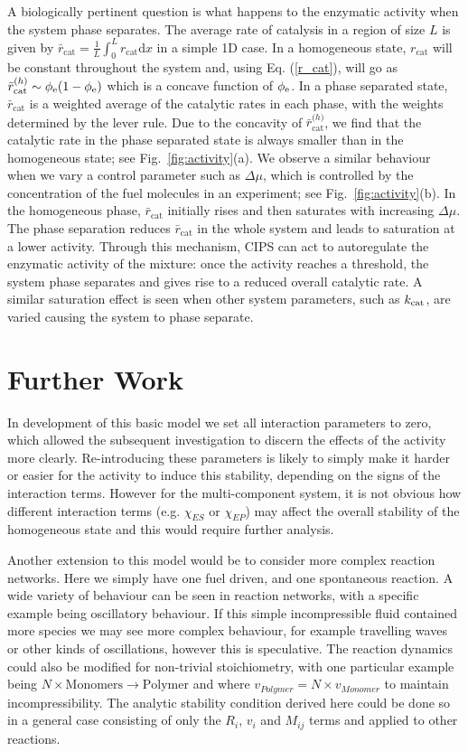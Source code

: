 A biologically pertinent question is what happens to the enzymatic activity when the system phase separates. The average rate of catalysis in a region of size $L$ is given by $\bar{r}_\mathrm{cat} = \frac{1}{L}\int_0^L r_\mathrm{cat} \mathrm{d}x$ in a simple 1D case. In a homogeneous state, $r_\mathrm{cat}$ will be constant throughout the system and, using Eq. (\ref{r_cat}), will go as $\bar{r}_\mathrm{cat}^{\mathrm(h)}\sim\phi_{\mathrm{e}}(1-\phi_{\mathrm{e}})$ which is a concave function of $\phi_{\mathrm{e}}$. In a phase separated state, $\bar{r}_\mathrm{cat}$ is a weighted average of the catalytic rates in each phase, with the weights determined by the lever rule. Due to the concavity of $\bar{r}_\mathrm{cat}^{\mathrm(h)}$, we find that the catalytic rate in the phase separated state is always smaller than in the homogeneous state; see Fig.~\ref{fig:activity}(a). We observe a similar behaviour when we vary a control parameter such as $\Delta\mu$, which is controlled by the concentration of the fuel molecules in an experiment; see Fig.~\ref{fig:activity}(b). In the homogeneous phase, $\bar{r}_\mathrm{cat}$ initially rises and then saturates with increasing $\Delta\mu$. The phase separation reduces $\bar{r}_\mathrm{cat}$ in the whole system and leads to saturation at a lower activity. Through this mechanism, CIPS can act to autoregulate the enzymatic activity of the mixture: once the activity reaches a threshold, the system phase separates and gives rise to a reduced overall catalytic rate. A similar saturation effect is seen when other system parameters, such as $k_{\mathrm{cat}}$, are varied causing the system to phase separate.

\section{Further Work}

In development of this basic model we set all interaction parameters to zero, which allowed the subsequent investigation to discern the effects of the activity more clearly. Re-introducing these parameters is likely to simply make it harder or easier for the activity to induce this stability, depending on the signs of the interaction terms. However for the multi-component system, it is not obvious how different interaction terms (e.g. $\chi_{ES}$  or $\chi_{EP}$) may affect the overall stability of the homogeneous state and this would require further analysis. 

Another extension to this model would be to consider more complex reaction networks. Here we simply have one fuel driven, and one spontaneous reaction. A wide variety of behaviour can be seen in reaction networks, with a specific example being oscillatory behaviour. If this simple incompressible fluid contained more species we may see more complex behaviour, for example travelling waves or other kinds of oscillations, however this is speculative. The reaction dynamics could also be modified for non-trivial stoichiometry, with one particular example being $N \times \text{Monomers} \rightarrow \text{Polymer}$ and where $v_{Polymer} = N \times v_{Monomer}$ to maintain incompressibility. The analytic stability condition derived here could be done so in a general case consisting of only the $R_i$, $v_i$ and $M_{ij}$ terms and applied to other reactions.

